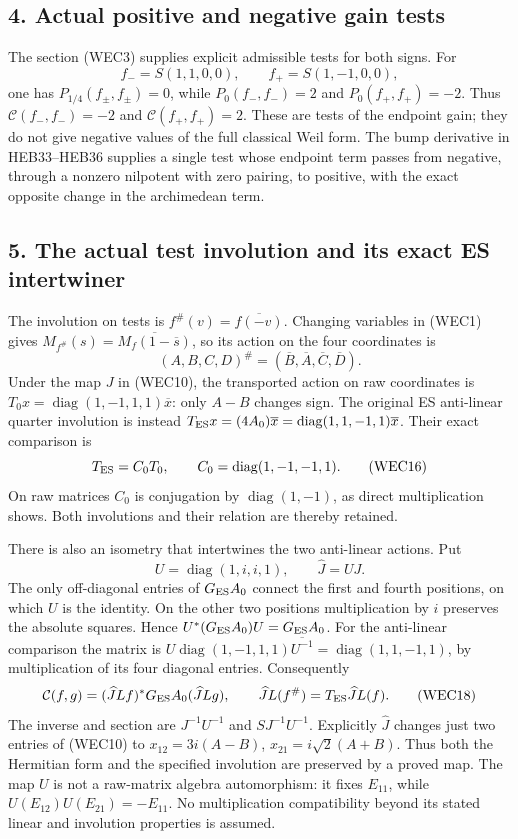 \documentclass[
  10pt,
  a4paper,
]{article}
\begin{document}
\subsection{4. Actual positive and negative gain
tests}\label{actual-positive-and-negative-gain-tests}

The section (WEC3) supplies explicit admissible tests for both signs.
For \[
f_-=S(1,1,0,0),\qquad f_+=S(1,-1,0,0),
\tag{WEC14}
\] one has \(P_{1/4}(f_\pm,f_\pm)=0\), while \(P_0(f_-,f_-)=2\) and
\(P_0(f_+,f_+)=-2\). Thus \(\mathcal C(f_-,f_-)=-2\) and
\(\mathcal C(f_+,f_+)=2\). These are tests of the endpoint gain; they do
not give negative values of the full classical Weil form. The bump
derivative in HEB33--HEB36 supplies a single test whose endpoint term
passes from negative, through a nonzero nilpotent with zero pairing, to
positive, with the exact opposite change in the archimedean term.

\subsection{5. The actual test involution and its exact ES
intertwiner}\label{the-actual-test-involution-and-its-exact-es-intertwiner}

The involution on tests is \(f^\#(v)=\overline{f(-v)}\). Changing
variables in (WEC1) gives \(M_{f^\#}(s)=\overline{M_f(1-\overline s)}\),
so its action on the four coordinates is \[
(A,B,C,D)^\#=(\overline B,\overline A,\overline C,\overline D).
\tag{WEC15}
\] Under the map \(J\) in (WEC10), the transported action on raw
coordinates is \(T_0x=\operatorname{diag}(1,-1,1,1)\overline x\): only
\(A-B\) changes sign. The original ES anti-linear quarter involution is
instead
\(T_{\rm ES}x=(4A_0)\overline x=\operatorname{diag}(1,1,-1,1)\overline x\).
Their exact comparison is \[
T_{\rm ES}=C_0T_0,\qquad C_0=\operatorname{diag}(1,-1,-1,1).
\tag{WEC16}
\] On raw matrices \(C_0\) is conjugation by
\(\operatorname{diag}(1,-1)\), as direct multiplication shows. Both
involutions and their relation are thereby retained.

There is also an isometry that intertwines the two anti-linear actions.
Put \[
U=\operatorname{diag}(1,i,i,1),\qquad\widehat J=UJ.
\tag{WEC17}
\] The only off-diagonal entries of \(G_{\rm ES}A_0\) connect the first
and fourth positions, on which \(U\) is the identity. On the other two
positions multiplication by \(i\) preserves the absolute squares. Hence
\(U^*(G_{\rm ES}A_0)U=G_{\rm ES}A_0\). For the anti-linear comparison
the matrix is
\(U\operatorname{diag}(1,-1,1,1)\overline{U^{-1}}=\operatorname{diag}(1,1,-1,1)\),
by multiplication of its four diagonal entries. Consequently \[
\mathcal C(f,g)=(\widehat JLf)^*G_{\rm ES}A_0(\widehat JLg),
\qquad \widehat JL(f^\#)=T_{\rm ES}\widehat JL(f).
\tag{WEC18}
\] The inverse and section are \(J^{-1}U^{-1}\) and \(SJ^{-1}U^{-1}\).
Explicitly \(\widehat J\) changes just two entries of (WEC10) to
\(x_{12}=3i(A-B)\), \(x_{21}=i\sqrt2(A+B)\). Thus both the Hermitian
form and the specified involution are preserved by a proved map. The map
\(U\) is not a raw-matrix algebra automorphism: it fixes \(E_{11}\),
while \(U(E_{12})U(E_{21})=-E_{11}\). No multiplication compatibility
beyond its stated linear and involution properties is assumed.
\end{document}
